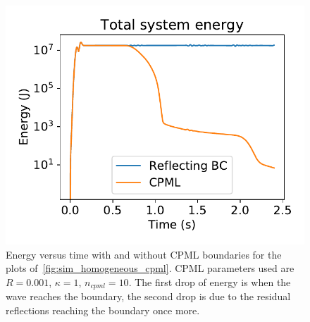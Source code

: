 \documentclass[fleqn,11pt]{SelfArx} %
\theoremstyle{definition}
\begin{document}
\begin{figure}[h]\centering %
\includegraphics[width=0.5\linewidth]{"fig/Energy_cpml_comparison"}
\caption{Energy versus time with and without CPML boundaries for the plots of~\cref{fig:sim_homogeneous_cpml}. CPML parameters used are $R=0.001$, $\kappa = 1$, $n_{cpml}=10$. The first drop of energy is when the wave reaches the boundary, the second drop is due to the residual reflections reaching the boundary once more.}
\label{fig:sim_energy_cpml_no_cpml}
\end{figure}
\end{document}
